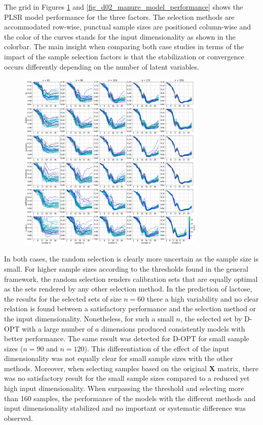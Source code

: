 \documentclass[journal=ancham,manuscript=article]{achemso}
\begin{document}
The grid in Figures \ref{fig_d01_milk_model_performance} and \ref{fig_d02_manure_model_performance} shows the PLSR model performance for the three factors. The selection methods are accommodated row-wise, punctual sample sizes are positioned column-wise and the color of the curves stands for the input dimensionality as shown in the colorbar. The main insight when comparing both case studies in terms of the impact of the sample selection factors is that the stabilization or convergence occurs differently depending on the number of latent variables. 


\begin{figure}[b]
\includegraphics[width=0.8\textwidth]{manuscript/figures/d01_milk_model_performance.png}
\centering
\caption{}
\label{fig_d01_milk_model_performance}
\end{figure}

In both cases, the random selection is clearly more uncertain as the sample size is small. For higher sample sizes according to the thresholds found in the general framework, the random selection renders calibration sets that are equally optimal as the sets rendered by any other selection method. In the prediction of lactose, the results for the selected sets of size $n=60$ there a high variability and no clear relation is found between a satisfactory performance and the selection method or the input dimensionality. Nonetheless, for such a small $n$, the selected set by D-OPT with a large number of $a$ dimensions produced consistently models with better performance. The same result was detected for D-OPT for small sample sizes ($n=90$ and $n=120$). This differentiation of the effect of the input dimensionality was not equally clear for small sample sizes with the other methods. Moreover, when selecting samples based on the original $\mathbf{X}$ matrix, there was no satisfactory result for the small sample sizes compared to a reduced yet high input dimensionality. When surpassing the threshold and selecting more than 160 samples, the performance of the models with the different methods and input dimensionality stabilized and no important or systematic difference was observed.
\end{document}
